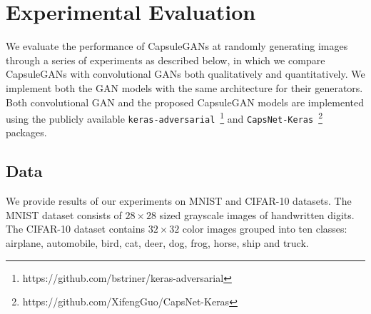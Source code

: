 \section{Experimental Evaluation}
\label{sec:evaluation}

We evaluate the performance of CapsuleGANs at randomly generating images through a series of experiments as described below, in which we compare CapsuleGANs with convolutional GANs both qualitatively and quantitatively. We implement both the GAN models with the same architecture for their generators. Both convolutional GAN and the proposed CapsuleGAN models are implemented using the publicly available \texttt{keras-adversarial}~\footnote{https://github.com/bstriner/keras-adversarial} and \texttt{CapsNet-Keras}~\footnote{https://github.com/XifengGuo/CapsNet-Keras} packages.

\subsection{Data}

We provide results of our experiments on MNIST and CIFAR-10 datasets. The MNIST dataset consists of $28 \times 28$ sized grayscale images of handwritten digits. The CIFAR-10 dataset contains $32 \times 32$ color images grouped into ten classes: airplane, automobile, bird, cat, deer, dog, frog, horse, ship and truck.

